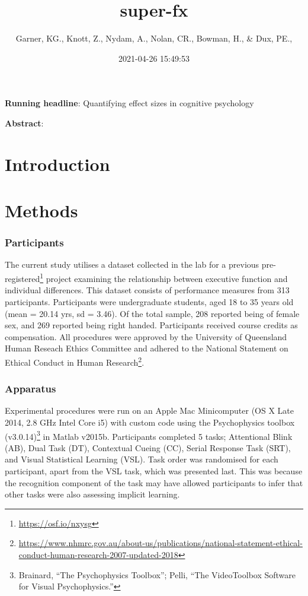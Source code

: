 \documentclass[
  12pt,
]{article}
\title{super-fx}
\author{Garner, KG., Knott, Z., Nydam, A., Nolan, CR., Bowman, H., \& Dux, PE.,}
\date{2021-04-26 15:49:53}
\DeclareRobustCommand{\href}[2]{#2\footnote{\url{#1}}}
\begin{document}
\maketitle

\iraggedright

\textbf{Running headline}: Quantifying effect sizes in cognitive psychology

\textbf{Abstract}:

\clearpage

\hypertarget{introduction}{%
\section{Introduction}\label{introduction}}

\hypertarget{methods}{%
\section{Methods}\label{methods}}

\hypertarget{participants}{%
\subsubsection{Participants}\label{participants}}

The current study utilises a dataset collected in the lab for a previous \href{https://osf.io/nxysg}{pre-registered} project examining the relationship between executive function and individual differences. This dataset consists of performance measures from 313 participants. Participants were undergraduate students, aged 18 to 35 years old (mean = 20.14 yrs, sd = 3.46). Of the total sample, 208 reported being of female sex, and 269 reported being right handed. Participants received course credits as compensation. All procedures were approved by the University of Queensland Human Reseach Ethics Committee and adhered to the \href{https://www.nhmrc.gov.au/about-us/publications/national-statement-ethical-conduct-human-research-2007-updated-2018}{National Statement on Ethical Conduct in Human Research}.

\hypertarget{apparatus}{%
\subsubsection{Apparatus}\label{apparatus}}

Experimental procedures were run on an Apple Mac Minicomputer (OS X Late 2014, 2.8 GHz Intel Core i5) with custom code using the Psychophysics toolbox (v3.0.14)\footnote{Brainard, ``The Psychophysics Toolbox''; Pelli, ``The VideoToolbox Software for Visual Psychophysics.''} in Matlab v2015b. Participants completed 5 tasks; Attentional Blink (AB), Dual Task (DT), Contextual Cueing (CC), Serial Response Task (SRT), and Visual Statistical Learning (VSL). Task order was randomised for each participant, apart from the VSL task, which was presented last. This was because the recognition component of the task may have allowed participants to infer that other tasks were also assessing implicit learning.
\end{document}

